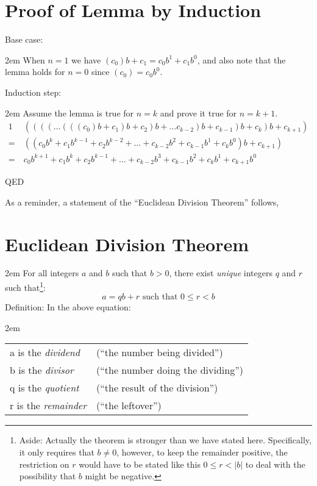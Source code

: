 \documentclass{article}
\newenvironment{jprIn}{\begin{adjustwidth}{2em}{}}{\end{adjustwidth}}
\begin{document}
\section*{Proof of Lemma by Induction}
Base case:
\begin{jprIn}
When \(n=1\) we have \((c_0)b + c_1 = c_0b^1 + c_1b^0\), and
also note that the lemma holds for \(n=0\) since \((c_0) = c_0b^0\).
\end{jprIn}
Induction step:
\begin{jprIn}
Assume the lemma is true for \(n=k\) and prove it true for \(n=k+1\).
{\small
\begin{alignat*}{1}
&((((\dots{}(((c_0)b + c_1)b + c_2)b + \dots{} c_{k-2})b + c_{k-1})b + c_k)b + c_{k+1})\\
=\  &((c_0b^k + c_1b^{k-1} + c_2b^{k-2} + \dots{} + c_{k-2}b^2 + c_{k-1}b^1 + c_{k}b^0)b + c_{k+1})\\
=\  &c_0b^{k+1} + c_1b^{k} + c_2b^{k-1} + \dots{} + c_{k-2}b^3 + c_{k-1}b^2 + c_{k}b^1 + c_{k+1}b^0
\end{alignat*}
}
\end{jprIn}
QED

As a reminder, a statement of the ``Euclidean Division Theorem'' follows,
\section*{Euclidean Division Theorem}
\begin{jprIn}
For all integers \(a\) and \(b\) such that \(b>0\),
there exist \emph{unique} integers \(q\) and \(r\) such that\footnote{Aside:
Actually the theorem is stronger than we have stated here.
Specifically, it only requires that \(b\ne0\), however,
to keep the remainder positive, the restriction on \(r\)
would have to be stated like
this \(0\le{}r<\left|b\right|\) to deal with
the possibility that \(b\) might be negative.}:
\[a=qb+r  \text{ such that } 0\le{}r<b\]
Definition: In the above equation:
\begin{jprIn}
\begin{tabular}{l l}
a is the \emph{dividend} & (``the number being divided'')\\
b is the \emph{divisor} & (``the number doing the dividing'')\\
q is the \emph{quotient} & (``the result of the division'')\\
r is the \emph{remainder} & (``the leftover'')
\end{tabular}
\end{jprIn}
\end{jprIn}
\end{document}
